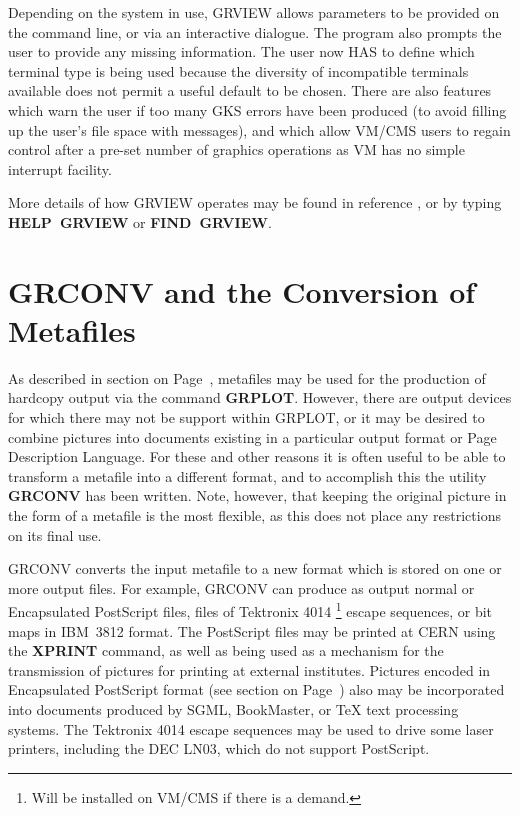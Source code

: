 Depending on the system in use, GRVIEW allows parameters to be provided
on the command line, or via an interactive dialogue. The program also
prompts the user to provide any missing information.
The user now HAS to define which terminal type is
being used because the diversity of incompatible terminals available does
not permit a useful default to be chosen.
There are also features which warn the user if too many GKS errors have
been produced (to avoid filling up the user's file space with messages),
and which allow VM/CMS users to regain control after a pre-set number of
graphics operations as VM has no simple interrupt facility.
 
More details of how GRVIEW operates may be found in reference
\cite{bib-grref}, or by typing {\bf HELP~GRVIEW} or
{\bf FIND~GRVIEW}.
\section{GRCONV and the Conversion of Metafiles}
 
As described in section on Page~\pageref{sec:mhcpref}, metafiles may be used for
the production of hardcopy output via the command {\bf GRPLOT}.
However, there are output devices for which there may not be support within
GRPLOT, or it may be desired to combine pictures into documents existing
in a particular output format or Page Description Language.
For these and other reasons it is often useful to be able to transform
a metafile into a different format, and to accomplish this the utility
{\bf GRCONV} has been written. Note, however, that keeping the
original picture in the form of a metafile is the most flexible, as
this does not place any restrictions on its final use.
 
GRCONV converts the input metafile to a new format which is stored on one
or more output files. For example, GRCONV can produce as output
normal or Encapsulated PostScript files, files of Tektronix 4014%
\footnote{Will be installed on VM/CMS if there is a demand.}
escape sequences, or bit maps in IBM~3812 format.
The PostScript files may be printed at CERN using the {\bf XPRINT}
command, as well as being used as a mechanism for the transmission of pictures
for printing at external institutes.
Pictures encoded in Encapsulated PostScript format
(see section on Page~\pageref{sec:epsref})
also may be incorporated into documents produced by SGML, BookMaster,
or TeX text processing systems.
The Tektronix 4014 escape sequences may be used to drive some laser printers,
including the DEC LN03, which do not support PostScript.
 
